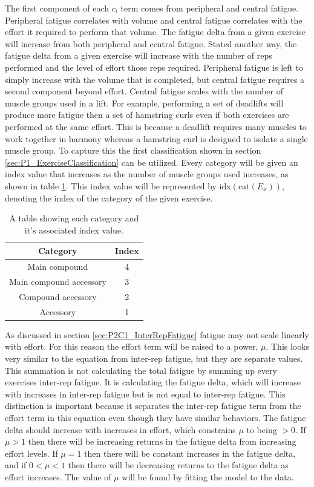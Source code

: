 The first component of each $c_i$ term comes from peripheral and central fatigue. Peripheral fatigue correlates with volume and central fatigue correlates with the effort it required to perform that volume. The fatigue delta from a given exercise will increase from both peripheral and central fatigue. Stated another way, the fatigue delta from a given exercise will increase with the number of reps performed and the level of effort those reps required. Peripheral fatigue is left to simply increase with the volume that is completed, but central fatigue requires a second component beyond effort. Central fatigue scales with the number of muscle groups used in a lift. For example, performing a set of deadlifts will produce more fatigue then a set of hamstring curls even if both exercises are performed at the same effort. This is because a deadlift requires many muscles to work together in harmony whereas a hamstring curl is designed to isolate a single muscle group. To capture this the first classification shown in section \ref{sec:P1_ExerciseClassification} can be utilized. Every category will be given an index value that increases as the number of muscle groups used increases, as shown in table \ref{tab:P2C1_CentralFatigueIndexValues}. This index value will be represented by $\text{idx}(\text{cat}(E_x))$, denoting the index of the category of the given exercise.

\begin{table}[h]
	\centering
    \begin{tabular}{|c|c|}
	    	\hline
        Category & Index \\
        \hline
        Main compound & 4 \\
        Main compound accessory & 3 \\
        Compound accessory & 2 \\
        Accessory & 1 \\
        \hline
    \end{tabular}
    \caption{A table showing each category and it's associated index value.}
    \label{tab:P2C1_CentralFatigueIndexValues}
\end{table}

As discussed in section \ref{sec:P2C1_InterRepFatigue} fatigue may not scale linearly with effort. For this reason the effort term will be raised to a power, $\mu$. This looks very similar to the equation from inter-rep fatigue, but they are separate values. This summation is not calculating the total fatigue by summing up every exercises inter-rep fatigue. It is calculating the fatigue delta, which will increase with increases in inter-rep fatigue but is not equal to inter-rep fatigue. This distinction is important because it separates the inter-rep fatigue term from the effort term in this equation even though they have similar behaviors. The fatigue delta should increase with increases in effort, which constrains $\mu$ to being $>0$. If $\mu>1$ then there will be increasing returns in the fatigue delta from increasing effort levels. If $\mu=1$ then there will be constant increases in the fatigue delta, and if $0<\mu<1$ then there will be decreasing returns to the fatigue delta as effort increases. The value of $\mu$ will be found by fitting the model to the data.

